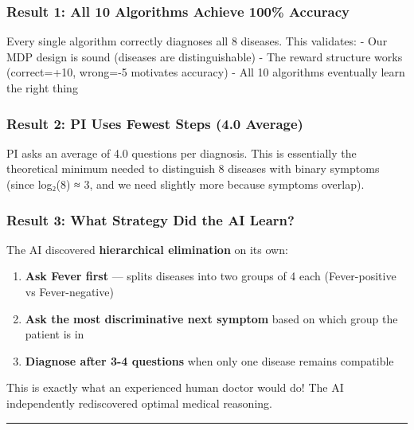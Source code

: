 \documentclass[
]{article}
\providecommand{\tightlist}{%
  \setlength{\itemsep}{0pt}\setlength{\parskip}{0pt}}
\begin{document}
\hypertarget{result-1-all-10-algorithms-achieve-100-accuracy}{%
\subsubsection{Result 1: All 10 Algorithms Achieve 100\%
Accuracy}\label{result-1-all-10-algorithms-achieve-100-accuracy}}

Every single algorithm correctly diagnoses all 8 diseases. This
validates: - Our MDP design is sound (diseases are distinguishable) -
The reward structure works (correct=+10, wrong=-5 motivates accuracy) -
All 10 algorithms eventually learn the right thing

\hypertarget{result-2-pi-uses-fewest-steps-4.0-average}{%
\subsubsection{Result 2: PI Uses Fewest Steps (4.0
Average)}\label{result-2-pi-uses-fewest-steps-4.0-average}}

PI asks an average of 4.0 questions per diagnosis. This is essentially
the theoretical minimum needed to distinguish 8 diseases with binary
symptoms (since log₂(8) ≈ 3, and we need slightly more because symptoms
overlap).

\hypertarget{result-3-what-strategy-did-the-ai-learn}{%
\subsubsection{Result 3: What Strategy Did the AI
Learn?}\label{result-3-what-strategy-did-the-ai-learn}}

The AI discovered \textbf{hierarchical elimination} on its own:

\begin{enumerate}
\def\labelenumi{\arabic{enumi}.}
\tightlist
\item
  \textbf{Ask Fever first} --- splits diseases into two groups of 4 each
  (Fever-positive vs Fever-negative)
\item
  \textbf{Ask the most discriminative next symptom} based on which group
  the patient is in
\item
  \textbf{Diagnose after 3-4 questions} when only one disease remains
  compatible
\end{enumerate}

This is exactly what an experienced human doctor would do! The AI
independently rediscovered optimal medical reasoning.

\begin{center}\rule{0.5\linewidth}{0.5pt}\end{center}
\end{document}
